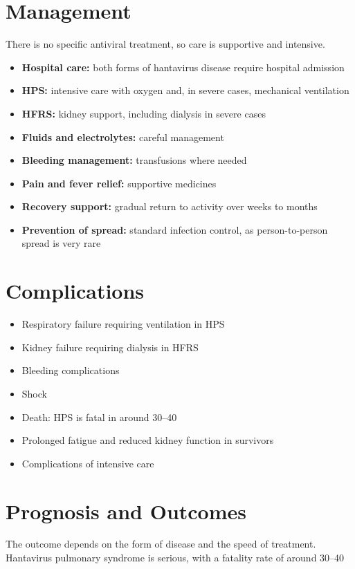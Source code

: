 \section*{Management}
There is no specific antiviral treatment, so care is supportive and intensive.

\begin{itemize}
    \item \textbf{Hospital care:} both forms of hantavirus disease require hospital admission
    \item \textbf{HPS:} intensive care with oxygen and, in severe cases, mechanical ventilation
    \item \textbf{HFRS:} kidney support, including dialysis in severe cases
    \item \textbf{Fluids and electrolytes:} careful management
    \item \textbf{Bleeding management:} transfusions where needed
    \item \textbf{Pain and fever relief:} supportive medicines
    \item \textbf{Recovery support:} gradual return to activity over weeks to months
    \item \textbf{Prevention of spread:} standard infection control, as person-to-person spread is very rare
\end{itemize}

\section*{Complications}
\begin{itemize}
    \item Respiratory failure requiring ventilation in HPS
    \item Kidney failure requiring dialysis in HFRS
    \item Bleeding complications
    \item Shock
    \item Death: HPS is fatal in around 30--40%
    \item Prolonged fatigue and reduced kidney function in survivors
    \item Complications of intensive care
\end{itemize}

\section*{Prognosis and Outcomes}
The outcome depends on the form of disease and the speed of treatment. Hantavirus pulmonary syndrome is serious, with a fatality rate of around 30--40%

